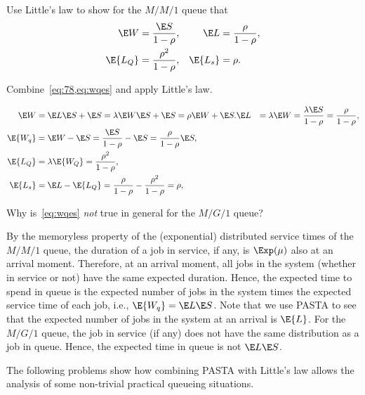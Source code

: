 \begin{exercise}
Use Little's law to show for the $M/M/1$ queue that 
 \begin{align*}
 \E W &= \frac{\E S}{1-\rho}, & \E L &= \frac\rho{1-\rho}, \\
 \E{L_Q} &= \frac{\rho^2}{1-\rho}, & \E{L_s} &= \rho.
 \end{align*}
\begin{hint}
 Combine~\cref{eq:78,eq:wqes} and apply Little's law. 
\end{hint}
\begin{solution}
\begin{align*}
 \E W &= \E L \E S + \E S = \lambda \E W \E S + \E S= \rho \E W + \E S. 
 \E L &= \lambda \E W = \frac{\lambda \E S}{1-\rho} = \frac\rho{1-\rho}, \\
 \E{W_q} &= \E W - \E S = \frac{\E S}{1-\rho} - \E S = \frac{\rho}{1-\rho} \E S,\\
 \E{L_Q} &= \lambda \E{W_Q} = \frac{\rho^2}{1-\rho}, \\
 \E{L_s} &= \E L - \E{L_Q} = \frac{\rho}{1-\rho} - \frac{\rho^2}{1-\rho} = \rho, 
\end{align*}
\end{solution}
\end{exercise}

\begin{exercise}
Why is~\cref{eq:wqes} \emph{not} true in general for the $M/G/1$ queue? 
\begin{solution}
 By the memoryless property of the (exponential) distributed service times of the $M/M/1$ queue, the duration of a job in service, if any, is $\Exp(\mu)$ also at an arrival moment.
 Therefore, at an arrival moment, all jobs in the system (whether in service or not) have the same expected duration.
 Hence, the expected time to spend in queue is the expected number of jobs in the system times the expected service time of each job, i.e., $\E{W_q} = \E L \E S$.
 Note that we use PASTA to see that the expected number of jobs in the system at an arrival is $\E{L}$.
 For the $M/G/1$ queue, the job in service (if any) does not have the same distribution as a job in queue.
 Hence, the expected time in queue is not $\E L \E S$.
\end{solution}
\end{exercise}


The following problems show how combining PASTA with Little's law allows the analysis of some non-trivial practical queueing situations.

